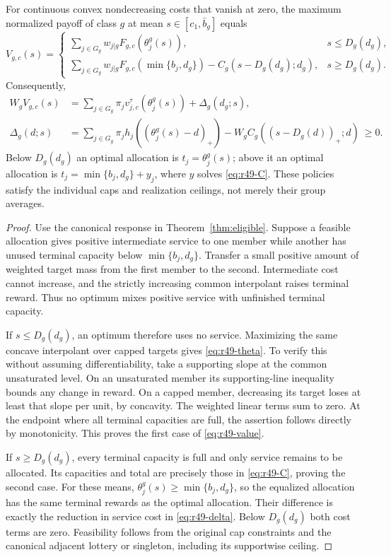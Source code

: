 \begin{theorem}\label{thm:r49-pooling}
For continuous convex nondecreasing costs that vanish at zero, the maximum normalized payoff of class $g$ at mean $s\in[c_1,\bar b_g]$ equals
\begin{equation}\label{eq:r49-value}
 V_{g,c}(s)=
 \begin{cases}
 \displaystyle\sum_{j\in G_g}w_{j|g}F_{g,c}(\theta_j^g(s)),&s\leq D_g(d_g),\\[1mm]
 \displaystyle\sum_{j\in G_g}w_{j|g}F_{g,c}(\min\{b_j,d_g\})
       -C_g(s-D_g(d_g);d_g),&s\geq D_g(d_g).
 \end{cases}
\end{equation}
Consequently,
\begin{align}
 W_gV_{g,c}(s)
 &=\sum_{j\in G_g}\pi_jv_{j,c}^{\tau}(\theta_j^g(s))
       +\Delta_g(d_g;s),\label{eq:r49-correction}\\
 \Delta_g(d;s)
 &=\sum_{j\in G_g}\pi_jh_j((\theta_j^g(s)-d)_+)
   -W_g C_g((s-D_g(d))_+;d)\ \geq0.\label{eq:r49-delta}
\end{align}
Below $D_g(d_g)$ an optimal allocation is $t_j=\theta_j^g(s)$; above it an optimal allocation is $t_j=\min\{b_j,d_g\}+y_j$, where $y$ solves \eqref{eq:r49-C}. These policies satisfy the individual caps and realization ceilings, not merely their group averages.
\end{theorem}
\begin{proof}
Use the canonical response in Theorem~\ref{thm:eligible}. Suppose a feasible allocation gives positive intermediate service to one member while another has unused terminal capacity below $\min\{b_j,d_g\}$. Transfer a small positive amount of weighted target mass from the first member to the second. Intermediate cost cannot increase, and the strictly increasing common interpolant raises terminal reward. Thus no optimum mixes positive service with unfinished terminal capacity.

If $s\leq D_g(d_g)$, an optimum therefore uses no service. Maximizing the same concave interpolant over capped targets gives \eqref{eq:r49-theta}. To verify this without assuming differentiability, take a supporting slope at the common unsaturated level. On an unsaturated member its supporting-line inequality bounds any change in reward. On a capped member, decreasing its target loses at least that slope per unit, by concavity. The weighted linear terms sum to zero. At the endpoint where all terminal capacities are full, the assertion follows directly by monotonicity. This proves the first case of \eqref{eq:r49-value}.

If $s\geq D_g(d_g)$, every terminal capacity is full and only service remains to be allocated. Its capacities and total are precisely those in \eqref{eq:r49-C}, proving the second case. For these means, $\theta_j^g(s)\geq\min\{b_j,d_g\}$, so the equalized allocation has the same terminal rewards as the optimal allocation. Their difference is exactly the reduction in service cost in \eqref{eq:r49-delta}. Below $D_g(d_g)$ both cost terms are zero. Feasibility follows from the original cap constraints and the canonical adjacent lottery or singleton, including its supportwise ceiling.\end{proof}


